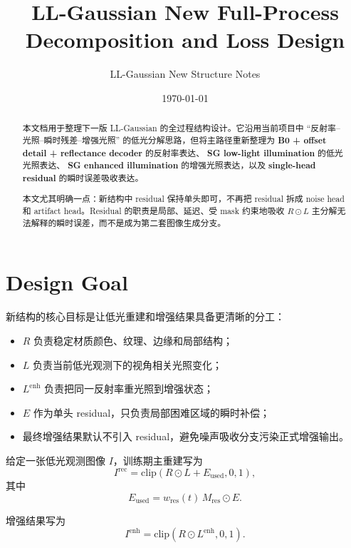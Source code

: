 \documentclass[11pt]{article}
\title{LL-Gaussian New Full-Process Decomposition and Loss Design}
\author{LL-Gaussian New Structure Notes}
\date{\today}
\begin{document}
\maketitle

\begin{abstract}
本文档用于整理下一版 LL-Gaussian 的全过程结构设计。它沿用当前项目中
``反射率--光照--瞬时残差--增强光照'' 的低光分解思路，但将主路径重新整理为
\textbf{B0 + offset detail + reflectance decoder} 的反射率表达、
\textbf{SG low-light illumination} 的低光光照表达、
\textbf{SG enhanced illumination} 的增强光照表达，以及
\textbf{single-head residual} 的瞬时误差吸收表达。

本文尤其明确一点：新结构中 residual 保持单头即可，不再把 residual 拆成
noise head 和 artifact head。Residual 的职责是局部、延迟、受 mask 约束地吸收
$R \odot L$ 主分解无法解释的瞬时误差，而不是成为第二套图像生成分支。
\end{abstract}

\section{Design Goal}

新结构的核心目标是让低光重建和增强结果具备更清晰的分工：
\begin{itemize}[leftmargin=1.5em]
    \item $R$ 负责稳定材质颜色、纹理、边缘和局部结构；
    \item $L$ 负责当前低光观测下的视角相关光照变化；
    \item $L^{\text{enh}}$ 负责把同一反射率重光照到增强状态；
    \item $E$ 作为单头 residual，只负责局部困难区域的瞬时补偿；
    \item 最终增强结果默认不引入 residual，避免噪声吸收分支污染正式增强输出。
\end{itemize}

给定一张低光观测图像 $I$，训练期主重建写为
\begin{equation}
    I^{\text{rec}}
    =
    \mathrm{clip}
    \left(
        R \odot L + E_{\text{used}},
        0, 1
    \right),
\end{equation}
其中
\begin{equation}
    E_{\text{used}} = w_{\text{res}}(t) \, M_{\text{res}} \odot E.
\end{equation}

增强结果写为
\begin{equation}
    I^{\text{enh}} = \mathrm{clip}\left(R \odot L^{\text{enh}}, 0, 1\right).
\end{equation}
\end{document}
